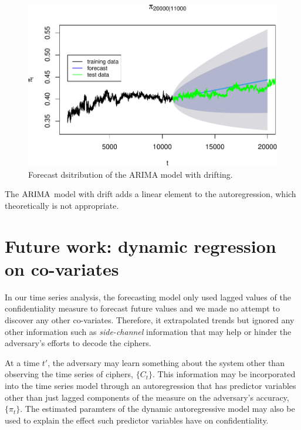 \documentclass[final,
  11pt,
]{article}
\begin{document}
\begin{figure}
\includegraphics{paper_files/figure-latex/unnamed-chunk-22-1.pdf}
\caption{Forecast dsitribution of the ARIMA model with drifting.}
\label{fig:drift}
\end{figure}


The \(\operatorname{ARIMA}\) model with drift adds a linear element to the
autoregression, which theoretically is not appropriate.

\hypertarget{future-work-dynamic-regression-on-co-variates}{%
\section{Future work: dynamic regression on
co-variates}\label{future-work-dynamic-regression-on-co-variates}}

\label{sec:future} In our time series analysis, the forecasting model
only used lagged values of the confidentiality measure to forecast
future values and we made no attempt to discover any other co-variates.
Therefore, it extrapolated trends but ignored any other information such
as \emph{side-channel} information that may help or hinder the
adversary's efforts to decode the ciphers.

At a time \(t'\), the adversary may learn something about the system
other than observing the time series of ciphers, \(\{C_t\}\). This
information may be incorporated into the time series model through an
autoregression that has predictor variables other than just lagged
components of the measure on the adversary's accuracy, \(\{\pi_t\}\).
The estimated paramters of the dynamic autoregressive model may also be
used to explain the effect such predictor variables have on
confidentiality.
\end{document}
